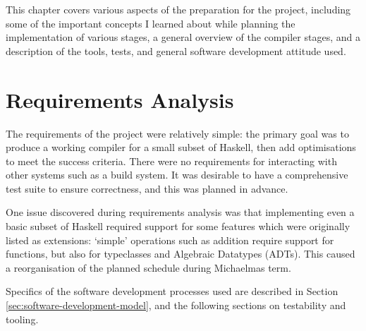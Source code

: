 \documentclass[dissertation.tex]{subfiles}
\begin{document}
This chapter covers various aspects of the preparation for the project, including some of the important concepts I learned about while planning the implementation of various stages, a general overview of the compiler stages, and a description of the tools, tests, and general software development attitude used.

\section{Requirements Analysis}
{
    The requirements of the project were relatively simple: the primary goal was to produce a working compiler for a small subset of Haskell, then add optimisations to meet the success criteria. There were no requirements for interacting with other systems such as a build system. It was desirable to have a comprehensive test suite to ensure correctness, and this was planned in advance.

    One issue discovered during requirements analysis was that implementing even a basic subset of Haskell required support for some features which were originally listed as extensions: `simple' operations such as addition require support for functions, but also for typeclasses and Algebraic Datatypes (ADTs). This caused a reorganisation of the planned schedule during Michaelmas term.

    Specifics of the software development processes used are described in Section \ref{sec:software-development-model}, and the following sections on testability and tooling.
}
\end{document}

